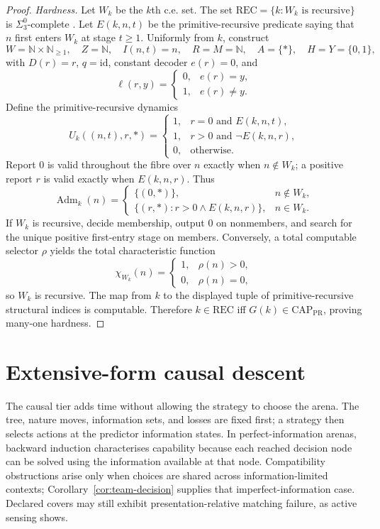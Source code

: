 \documentclass[11pt]{article}
\theoremstyle{plain}
\theoremstyle{definition}
\theoremstyle{remark}
\newcommand{\N}{\mathbb{N}}
\newcommand{\Adm}{\operatorname{Adm}}
\begin{document}
\begin{proof}
\emph{Hardness.} Let $W_k$ be the $k$th c.e. set. The set
$\mathrm{REC}=\{k:W_k\text{ is recursive}\}$ is $\Sigma^0_3$-complete
\cite{soare}. Let $E(k,n,t)$ be the primitive-recursive predicate saying that
$n$ first enters $W_k$ at stage $t\ge1$. Uniformly from $k$, construct
\[
W=\N\times\N_{\ge1},\quad Z=\N,\quad I(n,t)=n,
\quad R=M=\N,\quad A=\{\ast\},\quad H=Y=\{0,1\},
\]
with $D(r)=r$, $q=\mathrm{id}$, constant decoder $e(r)=0$, and
\[
\ell(r,y)=
\begin{cases}0,&e(r)=y,\\1,&e(r)\ne y.\end{cases}
\]
Define the primitive-recursive dynamics
\[
U_k((n,t),r,\ast)=
\begin{cases}
1,&r=0\text{ and }E(k,n,t),\\
1,&r>0\text{ and }\neg E(k,n,r),\\
0,&\text{otherwise}.
\end{cases}
\]
Report $0$ is valid throughout the fibre over $n$ exactly when
$n\notin W_k$; a positive report $r$ is valid exactly when $E(k,n,r)$. Thus
\[
\Adm_k(n)=
\begin{cases}
\{(0,\ast)\},&n\notin W_k,\\
\{(r,\ast):r>0\land E(k,n,r)\},&n\in W_k.
\end{cases}
\]
If $W_k$ is recursive, decide membership, output $0$ on nonmembers, and search
for the unique positive first-entry stage on members. Conversely, a total
computable selector $\rho$ yields the total characteristic function
\[
\chi_{W_k}(n)=
\begin{cases}1,&\rho(n)>0,\\0,&\rho(n)=0,\end{cases}
\]
so $W_k$ is recursive. The map from $k$ to the displayed tuple of
primitive-recursive structural indices is computable. Therefore
$k\in\mathrm{REC}$ iff $G(k)\in\mathrm{CAP}_{\mathrm{PR}}$, proving many-one
hardness.
\end{proof}

\section{Extensive-form causal descent}\label{sec:feedback}

The causal tier adds time without allowing the strategy to choose the arena. The
tree, nature moves, information sets, and losses are fixed first; a strategy then
selects actions at the predictor information states. In perfect-information
arenas, backward induction characterises capability because each reached decision
node can be solved using the information available at that node. Compatibility
obstructions arise only when choices are shared across information-limited
contexts; Corollary~\ref{cor:team-decision} supplies that imperfect-information
case. Declared covers may still exhibit presentation-relative matching failure,
as active sensing shows.
\end{document}
